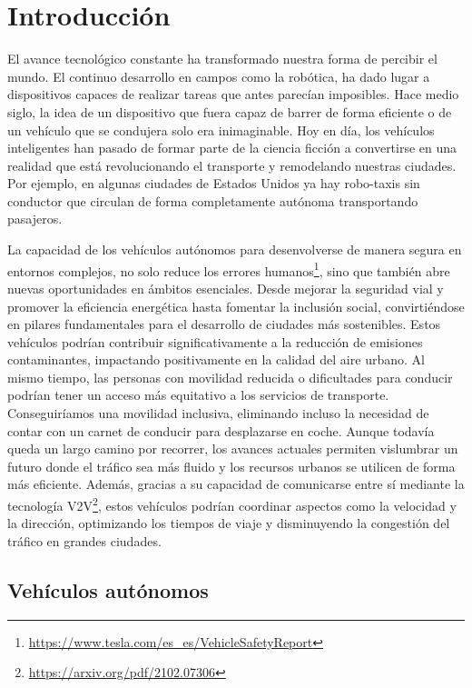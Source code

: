 \chapter{Introducción}
\label{cap:introduccion}
\setcounter{page}{1}

El avance tecnológico constante ha transformado nuestra forma de percibir el mundo. El continuo desarrollo en campos como la robótica, ha dado lugar a dispositivos capaces de realizar tareas que antes parecían imposibles. Hace medio siglo, la idea de un dispositivo que fuera capaz de barrer de forma eficiente o de un vehículo que se condujera solo era inimaginable. Hoy en día, los vehículos inteligentes han pasado de formar parte de la ciencia ficción a convertirse en una realidad que está revolucionando el transporte y remodelando nuestras ciudades. Por ejemplo, en algunas ciudades de Estados Unidos ya hay robo-taxis sin conductor que circulan de forma completamente autónoma transportando pasajeros.

La capacidad de los vehículos autónomos para desenvolverse de manera segura en entornos complejos, no solo reduce los errores humanos\footnote{\url{https://www.tesla.com/es_es/VehicleSafetyReport}}, sino que también abre nuevas oportunidades en ámbitos esenciales. Desde mejorar la seguridad vial y promover la eficiencia energética hasta fomentar la inclusión social, convirtiéndose en pilares fundamentales para el desarrollo de ciudades más sostenibles. Estos vehículos podrían contribuir significativamente a la reducción de emisiones contaminantes, impactando positivamente en la calidad del aire urbano. Al mismo tiempo, las personas con movilidad reducida o dificultades para conducir podrían tener un acceso más equitativo a los servicios de transporte. Conseguiríamos una movilidad inclusiva, eliminando incluso la necesidad de contar con un carnet de conducir para desplazarse en coche. Aunque todavía queda un largo camino por recorrer, los avances actuales permiten vislumbrar un futuro donde el tráfico sea más fluido y los recursos urbanos se utilicen de forma más eficiente. Además, gracias a su capacidad de comunicarse entre sí mediante la tecnología \ac{V2V}\footnote{\url{https://arxiv.org/pdf/2102.07306}}, estos vehículos podrían coordinar aspectos como la velocidad y la dirección, optimizando los tiempos de viaje y disminuyendo la congestión del tráfico en grandes ciudades.

\section{Vehículos autónomos}
\label{sec:vehículos}

